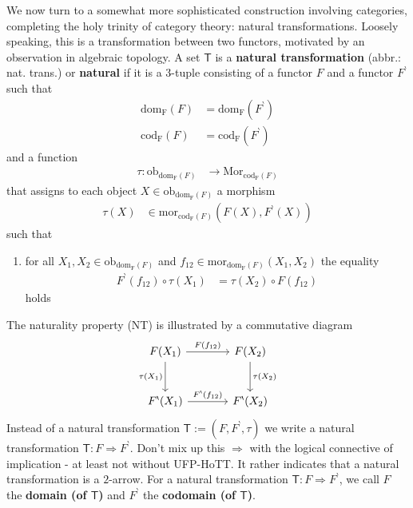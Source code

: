 We now turn to a somewhat more sophisticated construction involving categories, completing the holy trinity of category theory: natural transformations.
Loosely speaking, this is a transformation between two functors, motivated by an observation in algebraic topology.
A set $\mathsf{T}$ is a \textbf{natural transformation} (abbr.: nat. trans.) or \textbf{natural} if it is a $3$-tuple consisting of a functor $F$ and a functor $F^{\backprime}$ such that
\begin{align*}
  \mathrm{dom_{F}}(F)
  &=
  \mathrm{dom_{F}}(F^{\backprime})
  \\
  \mathrm{cod_{F}}(F)
  &=
  \mathrm{cod_{F}}(F^{\backprime})
\end{align*}
and a function
\begin{align*}
  \tau
  \colon
  \mathrm{ob}_{\mathrm{dom_{F}}(F)}
  &\rightarrow
  \mathrm{Mor}_{\mathrm{cod_{F}}(F)}
\end{align*}
that assigns to each object $X \in \mathrm{ob}_{\mathrm{dom_{F}}(F)}$ a morphism
\begin{align*}
  \tau(X)
  &\in
  \mathrm{mor}_{\mathrm{cod_{F}}(F)}(F(X),F^{\backprime}(X))
\end{align*}
such that
\begin{enumerate}
\item[(NT)]
for all $X_{1},X_{2} \in \mathrm{ob}_{\mathrm{dom_{F}}(F)}$ and $f_{12} \in \mathrm{mor}_{\mathrm{dom_{F}}(F)}(X_{1},X_{2})$ the equality
\begin{align*}
  F^{\backprime}(f_{12})
  \circ
  \tau(X_{1})
  &=
  \tau(X_{2})
  \circ
  F(f_{12})
\end{align*}
holds
\end{enumerate}
The naturality property (NT) is illustrated by a commutative diagram
\[
\begin{tikzcd}[sep=large]
  F(X_{1})
  \arrow{r}{F(f_{12})}
  \arrow[swap]{d}{\tau(X_{1})}
  &
  F(X_{2})
  \arrow{d}{\tau(X_{2})}
  \\
  F^{\backprime}(X_{1})
  \arrow{r}{F^{\backprime}(f_{12})}
  &
  F^{\backprime}(X_{2})
\end{tikzcd}
\]
Instead of {\glqq}a natural transformation $\mathsf{T} := (F,F^{\backprime},\tau)${\grqq} we write {\glqq}a natural transformation $\mathsf{T} \colon F \Rightarrow F^{\backprime}${\grqq}.
Don't mix up this $\Rightarrow$ with the logical connective of implication - at least not without UFP-HoTT.
It rather indicates that a natural transformation is a $2$-arrow.
For a natural transformation $\mathsf{T} \colon F \Rightarrow F^{\backprime}$, we call $F$ the \textbf{domain (of $\mathsf{T}$)} and $F^{\backprime}$ the \textbf{codomain (of $\mathsf{T}$)}.
